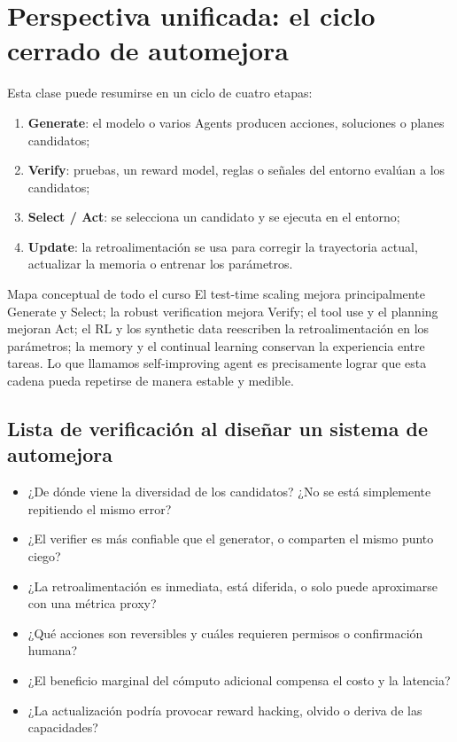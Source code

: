 \section{Perspectiva unificada: el ciclo cerrado de automejora}

Esta clase puede resumirse en un ciclo de cuatro etapas:

\begin{enumerate}
    \item \textbf{Generate}: el modelo o varios Agents producen acciones, soluciones o planes candidatos;
    \item \textbf{Verify}: pruebas, un reward model, reglas o señales del entorno evalúan a los candidatos;
    \item \textbf{Select / Act}: se selecciona un candidato y se ejecuta en el entorno;
    \item \textbf{Update}: la retroalimentación se usa para corregir la trayectoria actual, actualizar la memoria o entrenar los parámetros.
\end{enumerate}

\begin{importantbox}{Mapa conceptual de todo el curso}
El test-time scaling mejora principalmente Generate y Select; la robust verification mejora Verify; el tool use y el planning mejoran Act; el RL y los synthetic data reescriben la retroalimentación en los parámetros; la memory y el continual learning conservan la experiencia entre tareas. Lo que llamamos self-improving agent es precisamente lograr que esta cadena pueda repetirse de manera estable y medible.
\end{importantbox}

\subsection{Lista de verificación al diseñar un sistema de automejora}

\begin{itemize}
    \item ¿De dónde viene la diversidad de los candidatos? ¿No se está simplemente repitiendo el mismo error?
    \item ¿El verifier es más confiable que el generator, o comparten el mismo punto ciego?
    \item ¿La retroalimentación es inmediata, está diferida, o solo puede aproximarse con una métrica proxy?
    \item ¿Qué acciones son reversibles y cuáles requieren permisos o confirmación humana?
    \item ¿El beneficio marginal del cómputo adicional compensa el costo y la latencia?
    \item ¿La actualización podría provocar reward hacking, olvido o deriva de las capacidades?
\end{itemize}

